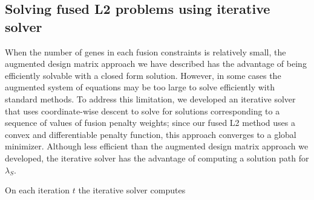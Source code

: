 \documentclass[11pt]{article}
\begin{document}

\subsection{Solving fused L2 problems using iterative solver}

When the number of genes in each fusion constraints is relatively small, the augmented design matrix approach we have described has the advantage of being efficiently solvable with a closed form solution. However, in some cases the augmented system of equations may be too large to solve efficiently with standard methods. To address this limitation, we developed an iterative solver that uses coordinate-wise descent to solve for solutions corresponding to a sequence of values of fusion penalty weights; since our fused L2 method uses a convex and differentiable penalty function, this approach converges to a global minimizer. Although less efficient than the augmented design matrix approach we developed, the iterative solver has the advantage of computing a solution path for $\lambda_S$.

On each iteration $t$ the iterative solver computes
\end{document}
